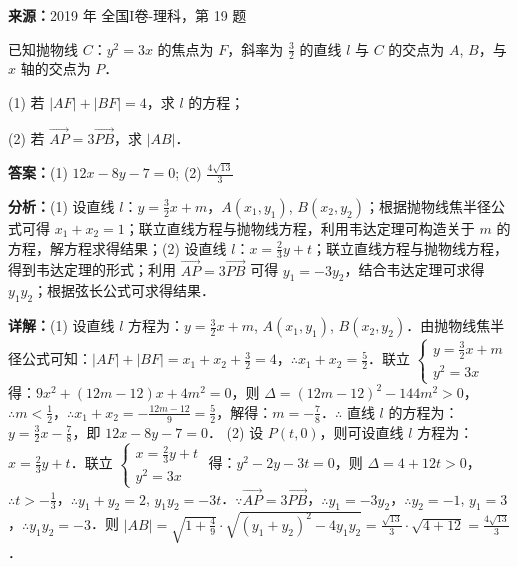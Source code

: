 \begin{question}[points=12]
\textbf{来源：}2019 年 全国I卷-理科，第 19 题\par
已知抛物线 $C$：$y^2 = 3x$ 的焦点为 $F$，斜率为 $\frac{3}{2}$ 的直线 $l$ 与 $C$ 的交点为 $A$, $B$，与 $x$ 轴的交点为 $P$．

(1) 若 $|AF| + |BF| = 4$，求 $l$ 的方程；

(2) 若 $\overrightarrow{AP} = 3\overrightarrow{PB}$，求 $|AB|$．
\begin{solution}
\textbf{答案：}(1) $12x - 8y - 7 = 0$; (2) $\frac{4\sqrt{13}}{3}$

\textbf{分析：}(1) 设直线 $l$：$y = \frac{3}{2}x + m$，$A(x_1, y_1)$, $B(x_2, y_2)$；根据抛物线焦半径公式可得 $x_1 + x_2 = 1$；联立直线方程与抛物线方程，利用韦达定理可构造关于 $m$ 的方程，解方程求得结果；(2) 设直线 $l$：$x = \frac{2}{3}y + t$；联立直线方程与抛物线方程，得到韦达定理的形式；利用 $\overrightarrow{AP} = 3\overrightarrow{PB}$ 可得 $y_1 = -3y_2$，结合韦达定理可求得 $y_1y_2$；根据弦长公式可求得结果．

\textbf{详解：}(1) 设直线 $l$ 方程为：$y = \frac{3}{2}x + m$, $A(x_1, y_1)$, $B(x_2, y_2)$．由抛物线焦半径公式可知：$|AF| + |BF| = x_1 + x_2 + \frac{3}{2} = 4$，$\therefore x_1 + x_2 = \frac{5}{2}$．联立 $\begin{cases} y = \frac{3}{2}x + m \\ y^2 = 3x \end{cases}$ 得：$9x^2 + (12m - 12)x + 4m^2 = 0$，则 $\Delta = (12m - 12)^2 - 144m^2 > 0$，$\therefore m < \frac{1}{2}$，$\therefore x_1 + x_2 = -\frac{12m - 12}{9} = \frac{5}{2}$，解得：$m = -\frac{7}{8}$．$\therefore$ 直线 $l$ 的方程为：$y = \frac{3}{2}x - \frac{7}{8}$，即 $12x - 8y - 7 = 0$．
(2) 设 $P(t, 0)$，则可设直线 $l$ 方程为：$x = \frac{2}{3}y + t$．联立 $\begin{cases} x = \frac{2}{3}y + t \\ y^2 = 3x \end{cases}$ 得：$y^2 - 2y - 3t = 0$，则 $\Delta = 4 + 12t > 0$，$\therefore t > -\frac{1}{3}$，$\therefore y_1 + y_2 = 2$, $y_1y_2 = -3t$．$\because \overrightarrow{AP} = 3\overrightarrow{PB}$，$\therefore y_1 = -3y_2$，$\therefore y_2 = -1$, $y_1 = 3$，$\therefore y_1y_2 = -3$．则 $|AB| = \sqrt{1 + \frac{4}{9}} \cdot \sqrt{(y_1 + y_2)^2 - 4y_1y_2} = \frac{\sqrt{13}}{3} \cdot \sqrt{4 + 12} = \frac{4\sqrt{13}}{3}$．
\end{solution}
\end{question}

